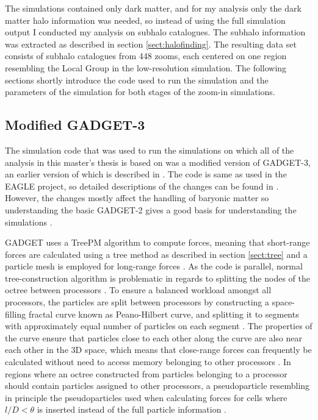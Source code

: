 \documentclass[english, oneside]{HYgradu}
\begin{document}
The simulations contained only dark matter, and for my analysis only the dark matter halo information was needed, so instead of using the full simulation output I conducted my analysis on subhalo catalogues. The subhalo information was extracted as described in section \ref{sect:halofinding}. The resulting data set consists of subhalo catalogues from 448 zooms, each centered on one region resembling the Local Group in the low-resolution simulation. The following sections shortly introduce the code used to run the simulation and the parameters of the simulation for both stages of the zoom-in simulations.





\subsection{Modified GADGET-3} \label{sect:gadget}
The simulation code that was used to run the simulations on which all of the analysis in this master's thesis is based on was a modified version of GADGET-3, an earlier version of which is described in \citet{springel2005cosmological}. The code is same as used in the EAGLE project, so detailed descriptions of the changes can be found in \citet{schaye2015eagle}. However, the changes mostly affect the handling of baryonic matter so understanding the basic GADGET-2 gives a good basis for understanding the simulations \citep{schaye2015eagle}.

GADGET uses a TreePM algorithm to compute forces, meaning that short-range forces are calculated using a tree method as described in section \ref{sect:tree} and a particle mesh is employed for long-range forces \citep{springel2005cosmological}. As the code is parallel, normal tree-construction algorithm is problematic in regards to splitting the nodes of the octree between processors \citep{springel2005cosmological}. To ensure a balanced workload amongst all processors, the particles are split between processors by constructing a space-filling fractal curve known as Peano-Hilbert curve, and splitting it to segments with approximately equal number of particles on each segment \citep{springel2005cosmological}. The properties of the curve ensure that particles close to each other along the curve are also near each other in the 3D space, which means that close-range forces can frequently be calculated without need to access memory belonging to other processors \citep{springel2005cosmological}. In regions where an octree constructed from particles belonging to a processor should contain particles assigned to other processors, a pseudoparticle resembling in principle the pseudoparticles used when calculating forces for cells where $l/D < \theta$ is inserted instead of the full particle information \citep{springel2005cosmological}.
\end{document}
